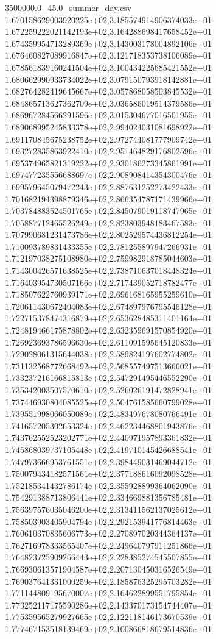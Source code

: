 \begin{filecontents*}{3500000.0_45.0_summer_day.csv}
1.670158629003920225e+02,3.185574914906374033e+01
1.672259222021142193e+02,3.164288698417658452e+01
1.674359954713289369e+02,3.143003178004892106e+01
1.676460827089916847e+02,3.121718353738106089e+01
1.678561839160241504e+02,3.100434225685421552e+01
1.680662990933734022e+02,3.079150793918142881e+01
1.682764282419645667e+02,3.057868058503845532e+01
1.684865713627362709e+02,3.036586019514379586e+01
1.686967284566291596e+02,3.015304677016501955e+01
1.689068995245833378e+02,2.994024031081698922e+01
1.691170845675238752e+02,2.972744081777909742e+01
1.693272835863922410e+02,2.951464829176802596e+01
1.695374965821319222e+02,2.930186273345861991e+01
1.697477235556688697e+02,2.908908414354300476e+01
1.699579645079472243e+02,2.887631252273422433e+01
1.701682194398879346e+02,2.866354787171439966e+01
1.703784883524501765e+02,2.845079019118747965e+01
1.705887712465526249e+02,2.823803948183467583e+01
1.707990681231473786e+02,2.802529574436812254e+01
1.710093789831433355e+02,2.781255897947266931e+01
1.712197038275108980e+02,2.759982918785044603e+01
1.714300426571638525e+02,2.738710637018448324e+01
1.716403954730507166e+02,2.717439052718782477e+01
1.718507622760939171e+02,2.696168165955259610e+01
1.720611430672404083e+02,2.674897976795546128e+01
1.722715378474316879e+02,2.653628485311401164e+01
1.724819466175878802e+02,2.632359691570854920e+01
1.726923693786596630e+02,2.611091595645120833e+01
1.729028061315644038e+02,2.589824197602774802e+01
1.731132568772668492e+02,2.568557497513666021e+01
1.733237216166815813e+02,2.547291495446552290e+01
1.735342003507570610e+02,2.526026191472828941e+01
1.737446930804085525e+02,2.504761585660799028e+01
1.739551998066050089e+02,2.483497678080766491e+01
1.741657205302653324e+02,2.462234468801943876e+01
1.743762552523202771e+02,2.440971957893361832e+01
1.745868039737105448e+02,2.419710145426688541e+01
1.747973666953761551e+02,2.398449031469044712e+01
1.750079434182571561e+02,2.377188616092098528e+01
1.752185341432786174e+02,2.355928899364062090e+01
1.754291388713806441e+02,2.334669881356785481e+01
1.756397576035046200e+02,2.313411562137025612e+01
1.758503903405904794e+02,2.292153941776814463e+01
1.760610370835606773e+02,2.270897020344364137e+01
1.762716978333565407e+02,2.249640797911251866e+01
1.764823725909266443e+02,2.228385274545507855e+01
1.766930613571904587e+02,2.207130450316526549e+01
1.769037641331000259e+02,2.185876325295703282e+01
1.771144809195670007e+02,2.164622899551795854e+01
1.773252117175590286e+02,2.143370173154744407e+01
1.775359565279927665e+02,2.122118146173670539e+01
1.777467153518139469e+02,2.100866818679514836e+01

\end{filecontents*}
